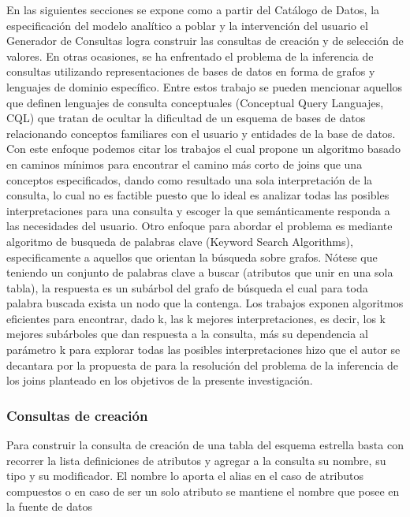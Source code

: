 En las siguientes secciones se expone como a partir del Catálogo de Datos, la especificaci\'on del 
modelo analítico a poblar y la intervenci\'on del usuario el Generador de Consultas logra construir 
las consultas de creaci\'on y de selecci\'on de valores.
En otras ocasiones, se ha enfrentado el problema de la inferencia de consultas utilizando representaciones
de bases de datos en forma de grafos y lenguajes 
de dominio espec\'ifico. Entre estos trabajo se pueden mencionar aquellos que definen lenguajes de consulta 
conceptuales (Conceptual Query Languajes, CQL) que tratan de ocultar la dificultad de un esquema de bases de 
datos relacionando conceptos familiares con el usuario y entidades de la base de datos. Con este enfoque 
podemos citar los trabajos \cite{owei2001enriching} el cual propone
un algoritmo basado en caminos m\'inimos para encontrar el camino m\'as corto de joins que una conceptos 
especificados, dando como resultado una sola interpretaci\'on de la consulta, lo cual no es factible 
puesto que lo ideal es analizar todas las posibles interpretaciones para una consulta y escoger la 
que sem\'anticamente responda a las necesidades del usuario. Otro enfoque para abordar el problema 
es mediante algoritmo de busqueda de palabras clave (Keyword Search Algorithms), especificamente a 
aquellos que orientan la b\'usqueda sobre grafos. N\'otese que teniendo un conjunto de palabras clave 
a buscar (atributos que unir en una sola tabla), la respuesta es un sub\'arbol del grafo de b\'usqueda 
el cual para toda palabra buscada exista un nodo que la contenga. Los trabajos 
\cite{kimelfeld2006finding,hristidis2003efficient,he2007blinks} exponen algoritmos eficientes para 
encontrar, dado k, las k mejores interpretaciones, es decir, los k mejores sub\'arboles que dan respuesta 
a la consulta, m\'as su dependencia al par\'ametro k para explorar todas las posibles interpretaciones 
hizo que el autor se decantara por la propuesta de \cite{mason2005autojoin} para la resoluci\'on 
del problema de la inferencia de los joins planteado en los objetivos de la presente investigaci\'on.



\subsubsection{Consultas de creaci\'on}
Para construir la consulta de creaci\'on de una tabla del esquema estrella basta con recorrer 
la lista definiciones de atributos y agregar a la consulta su nombre, su tipo y su modificador. 
El nombre lo aporta el alias en el caso de atributos compuestos o en caso de ser un solo atributo 
se mantiene el nombre que posee en la fuente de datos